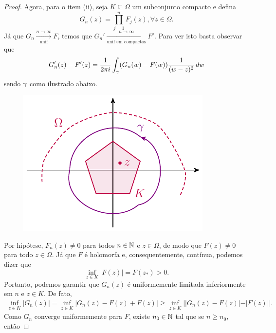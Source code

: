 \begin{proof}
       Agora, para o item (ii), seja $K\subseteq\Omega$ um subconjunto compacto
       e defina
       \begin{equation*}
           G_n(z) = \prod_{j=1}^n F_j(z), \forall z\in\Omega.
       \end{equation*}
       Já que $G_n \xrightarrow[\text{unif}]{n\to\infty} F$, temos que
       $G_n' \xrightarrow[\text{unif em compactos}]{n\to\infty} F'$.
       Para ver isto basta observar que
       \begin{equation*}
           G_n'(z) - F'(z) = 
           \frac{1}{2\pi i} \int_{\gamma} (G_n(w) - F(w))\frac{1}{(w-z)^2} \, dw
       \end{equation*}
       sendo $\gamma$ como ilustrado abaixo.
       \begin{figure}[H]\centering
           \includegraphics{Figuras/y para Gn'-Fn'.pdf}
       \end{figure}
       Por hipótese, $F_n(z) \neq 0$ para todos $n\in\mathbb{N}$ e $z\in\Omega$, de modo
       que $F(z)\neq 0$ para todo $z\in\Omega$. Já que $F$ é holomorfa e, 
       consequentemente, contínua, podemos dizer que
       \begin{equation*}
           \inf_{z\in K} |F(z)| = F(z_*) > 0.
       \end{equation*}
       Portanto, podemos garantir que $G_n(z)$ é uniformemente limitada inferiormente
       em $n$ e $z\in K$. De fato,
       \begin{align*}
           \inf_{z\in K} |G_n(z)| = \inf_{z\in K} |G_n(z) - F(z) + F(z)|
           \geq \inf_{z\in K} | |G_n(z) - F(z)| - |F(z)| |.
       \end{align*}
       Como $G_n$ converge uniformemente para $F$, existe $n_0\in\mathbb{N}$ tal que
       se $n\geq n_0$, então 

\end{proof}
